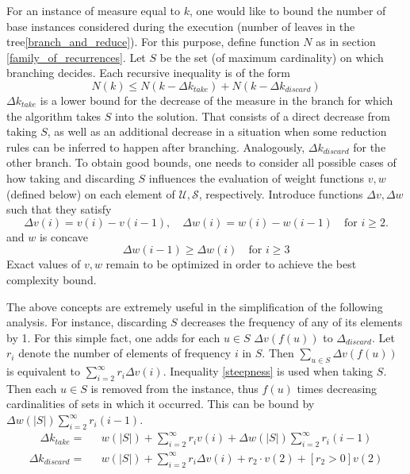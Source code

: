 For an instance of measure equal to $k$, one would like to bound the number of base instances considered during the execution (number of leaves in the tree\ref{branch_and_reduce}). For this purpose, define function $N$ as in section \ref{family_of_recurrences}. Let $S$ be the set (of maximum cardinality) on which branching decides. Each recursive inequality is of the form
$$
N(k) \leq N(k - \Delta k_{take}) + N(k - \Delta k_{discard})
$$
$\Delta k_{take}$ is a lower bound for the decrease of the measure in the branch for which the algorithm takes $S$ into the solution. That consists of a direct decrease from taking $S$, as well as an additional decrease in a situation when some reduction rules can be inferred to happen after branching. Analogously, $\Delta k_{discard}$ for the other branch. To obtain good bounds, one needs to consider all possible cases of how taking and discarding $S$ influences the evaluation of weight functions $v, w$ (defined below) on each element of $\mathcal{U}, \mathcal{S}$, respectively.   
Introduce functions $\Delta v, \Delta w$ such that they satisfy
$$
\Delta v(i) = v(i) - v(i - 1), \quad \Delta w(i) = w(i) - w(i - 1) \quad \text{for } i \geq 2.
$$
and $w$ is concave
\begin{equation}\label{steepness}
    \Delta w(i - 1) \geq \Delta w(i) \quad \text{for } i\geq 3
\end{equation}
Exact values of $v, w$ remain to be optimized in order to achieve the best complexity bound. 
\par The above concepts are extremely useful in the simplification of the following analysis. For instance, discarding $S$ decreases the frequency of any of its elements by 1. For this simple fact, one adds for each $u\in S$ $\Delta v(f(u))$ to $\Delta_{discard}$. Let $r_i$ denote the number of elements of frequency $i$ in $S$. Then $\sum_{u\in S} \Delta v(f(u))$ is equivalent to $\sum_{i=2}^\infty r_i \Delta v(i)$. Inequality \ref{steepness} is used when taking $S$. Then each $u\in S$ is removed from the instance, thus $f(u)$ times decreasing cardinalities of sets in which it occurred. This can be bound by $\Delta w(|S|)\sum_{i = 2}^\infty r_i(i - 1)$.
\begin{equation*}
    \begin{split}
        \Delta k_{take} = 
        &\text{ } w(|S|) + \sum_{i = 2}^\infty r_i v(i) + \Delta w(|S|)\sum_{i = 2}^\infty r_i(i - 1)
    \end{split}
\end{equation*}
\begin{equation*}
    \begin{split}
        \Delta k_{discard} =
        &\text{ } w(|S|) + \sum_{i = 2}^\infty r_i \Delta v(i) + r_2 \cdot v(2) + [r_2 > 0] v(2) 
    \end{split}
\end{equation*}

